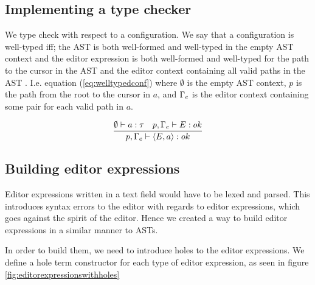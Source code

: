 \subsection{Implementing a type checker}

We type check with respect to a
configuration. We say that a configuration is well-typed iff; the AST is both
well-formed and well-typed in the empty AST context and the editor expression
is both well-formed and well-typed for the path to the cursor in the AST and
the editor context containing all valid paths in the AST \pepm. I.e. equation
(\ref{eq:welltypedconf}) where $\emptyset$ is the empty AST context, $p$ is the
path from the root to the cursor in $a$, and $\Gamma_{e}$ is the editor context
containing some pair for each valid path in $a$.

\begin{equation}\label{eq:welltypedconf}
  \frac{\emptyset \vdash a : \tau \quad p,\Gamma_{e} \vdash E : ok} {p,\Gamma_{e} \vdash \langle E,a \rangle : ok}\\ 
\end{equation}

\subsection{Building editor expressions}
Editor expressions written in a text field would have to be lexed and parsed.
This introduces syntax errors to the editor with regards to editor expressions,
which goes against the spirit of the editor. Hence we created a way to
build editor expressions in a similar manner to ASTs.

In order to build them, we need to introduce holes to the editor
expressions. We define a hole term constructor for each type of editor
expression, as seen in figure \ref{fig:editorexpressionswithholes}

